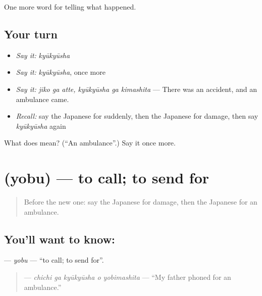 \begin{grammarlens}[title={What you've built}]
One more word for telling what happened.
\end{grammarlens}

\subsection*{Your turn}
\begin{itemize}
\raggedright
  \item \emph{Say it:} \emph{kyūkyūsha}
  \item \emph{Say it:} \emph{kyūkyūsha}, once more
  \item \emph{Say it:} \emph{jiko ga atte, kyūkyūsha ga kimashita} — There was an accident, and an ambulance came.
  \item \emph{Recall:} say the Japanese for suddenly, then the Japanese for damage, then say \emph{kyūkyūsha} again
\end{itemize}

\begin{tcolorbox}[breakable,colback=teal!4,colframe=teal!35!black,title={Before you move on}]
What does  mean? (\textquotedblleft{}An ambulance\textquotedblright{}.) Say it once more.
\end{tcolorbox}
\section[\texorpdfstring{\ja{よぶ} (yobu)}{よぶ (yobu)}]{ (yobu) — to call; to send for}

\label{lesson:JA-C263-yobu}



\begin{quote}
Before the new one: say the Japanese for damage, then the Japanese for an ambulance.
\end{quote}

\subsection*{You'll want to know: }
\textbf{} — \emph{yobu} — \textquotedblleft{}to call; to send for\textquotedblright{}.

\begin{quote}
\textbf{  } — \emph{chichi ga kyūkyūsha o yobimashita} — \textquotedblleft{}My father phoned for an ambulance.\textquotedblright{}
\end{quote}


